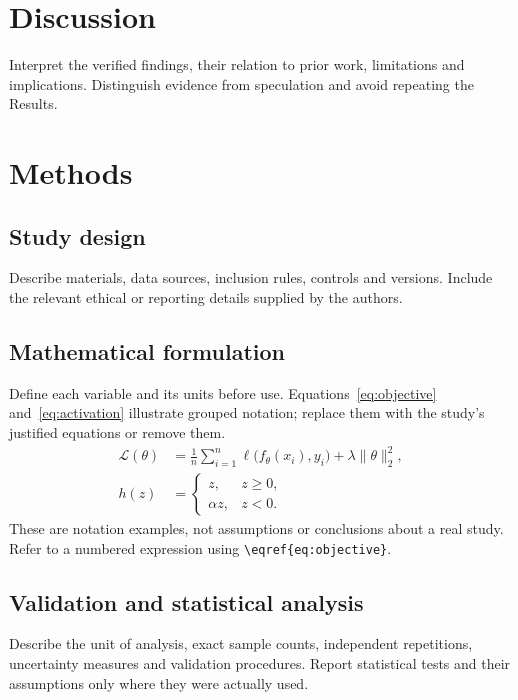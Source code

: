\documentclass[pdflatex,sn-nature]{sn-jnl}
\begin{document}
\section{Discussion}\label{sec:discussion}
Interpret the verified findings, their relation to prior work, limitations
and implications.
Distinguish evidence from speculation and avoid repeating the Results.

\section{Methods}\label{sec:methods}
\subsection{Study design}
Describe materials, data sources, inclusion rules, controls and versions.
Include the relevant ethical or reporting details supplied by the authors.

\subsection{Mathematical formulation}
Define each variable and its units before use. Equations~\eqref{eq:objective}
and~\eqref{eq:activation} illustrate grouped notation; replace them with the
study's justified equations or remove them.
\begin{subequations}\label{eq:model}
\begin{align}
  \mathcal{L}(\theta)&=\frac{1}{n}\sum_{i=1}^{n}
    \ell\bigl(f_\theta(x_i),y_i\bigr)+\lambda\lVert\theta\rVert_2^2,
    \label{eq:objective}\\
  h(z)&=\begin{cases}z,&z\geq0,\\\alpha z,&z<0.\end{cases}
    \label{eq:activation}
\end{align}
\end{subequations}
These are notation examples, not assumptions or conclusions about a real
study. Refer to a numbered expression using \verb|\eqref{eq:objective}|.

\subsection{Validation and statistical analysis}
Describe the unit of analysis, exact sample counts, independent repetitions,
uncertainty measures and validation procedures. Report statistical tests and
their assumptions only where they were actually used.
\end{document}
